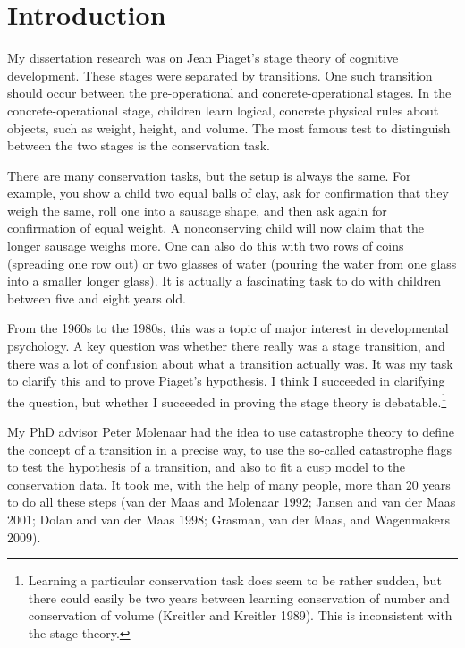 \documentclass[
  a4paper,
  DIV=11,
  numbers=noendperiod,
  oneside]{scrreprt}
\begin{document}
\section{Introduction}\label{sec-Introduction-ch3}

My dissertation research was on Jean Piaget's stage theory of cognitive
development. These stages were separated by transitions. One such
transition should occur between the pre-operational and
concrete-operational stages. In the concrete-operational stage, children
learn logical, concrete physical rules about objects, such as weight,
height, and volume. The most famous test to distinguish between the two
stages is the conservation task.

There are many conservation tasks, but the setup is always the same. For
example, you show a child two equal balls of clay, ask for confirmation
that they weigh the same, roll one into a sausage shape, and then ask
again for confirmation of equal weight. A nonconserving child will now
claim that the longer sausage weighs more. One can also do this with two
rows of coins (spreading one row out) or two glasses of water (pouring
the water from one glass into a smaller longer glass). It is actually a
fascinating task to do with children between five and eight years old.

From the 1960s to the 1980s, this was a topic of major interest in
developmental psychology. A key question was whether there really was a
stage transition, and there was a lot of confusion about what a
transition actually was. It was my task to clarify this and to prove
Piaget's hypothesis. I think I succeeded in clarifying the question, but
whether I succeeded in proving the stage theory is debatable.\footnote{Learning
  a particular conservation task does seem to be rather sudden, but
  there could easily be two years between learning conservation of
  number and conservation of volume (Kreitler and Kreitler 1989). This
  is inconsistent with the stage theory.}

My PhD advisor Peter Molenaar had the idea to use catastrophe theory to
define the concept of a transition in a precise way, to use the
so-called catastrophe flags to test the hypothesis of a transition, and
also to fit a cusp model to the conservation data. It took me, with the
help of many people, more than 20 years to do all these steps (van der
Maas and Molenaar 1992; Jansen and van der Maas 2001; Dolan and van der
Maas 1998; Grasman, van der Maas, and Wagenmakers 2009).
\end{document}
